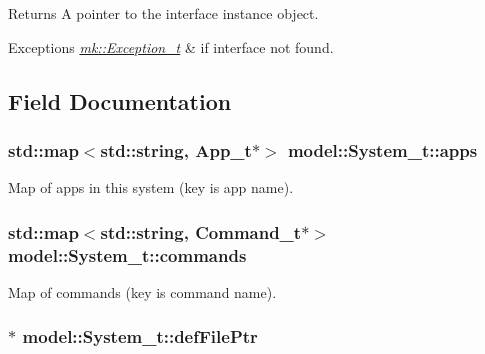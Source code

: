 \begin{DoxyReturn}{Returns}
A pointer to the interface instance object.
\end{DoxyReturn}

\begin{DoxyExceptions}{Exceptions}
{\em \hyperlink{classmk_1_1_exception__t}{mk\+::\+Exception\+\_\+t}} & if interface not found. \\
\hline
\end{DoxyExceptions}


\subsection{Field Documentation}
\subsubsection[{\texorpdfstring{apps}{apps}}]{\setlength{\rightskip}{0pt plus 5cm}std\+::map$<$std\+::string, {\bf App\+\_\+t}$\ast$$>$ model\+::\+System\+\_\+t\+::apps}\hypertarget{structmodel_1_1_system__t_a937e3fdbb57a592f26e1155660e8d095}{}\label{structmodel_1_1_system__t_a937e3fdbb57a592f26e1155660e8d095}


Map of apps in this system (key is app name). 

\subsubsection[{\texorpdfstring{commands}{commands}}]{\setlength{\rightskip}{0pt plus 5cm}std\+::map$<$std\+::string, {\bf Command\+\_\+t}$\ast$$>$ model\+::\+System\+\_\+t\+::commands}\hypertarget{structmodel_1_1_system__t_a7d15d515a4616b55e78c290133e9f34d}{}\label{structmodel_1_1_system__t_a7d15d515a4616b55e78c290133e9f34d}


Map of commands (key is command name). 

\subsubsection[{\texorpdfstring{def\+File\+Ptr}{defFilePtr}}]{$\ast$ model\+::\+System\+\_\+t\+::def\+File\+Ptr}\hypertarget{structmodel_1_1_system__t_a09045fa2228c3df3650f35f149cbb8f8}{}\label{structmodel_1_1_system__t_a09045fa2228c3df3650f35f149cbb8f8}


